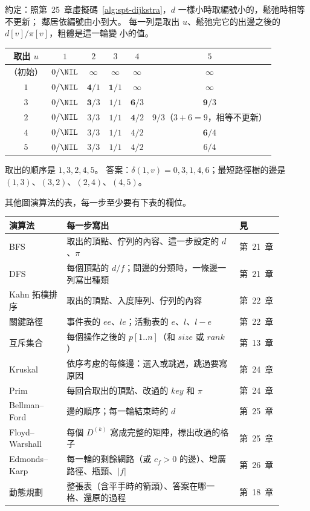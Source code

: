 \begin{exmgood}
約定：照第~25~章虛擬碼~\ref{alg:spt-dijkstra}，$d$ 一樣小時取編號小的，鬆弛時相等不更新；
鄰居依編號由小到大。 每一列是取出 $u$、鬆弛完它的出邊之後的 $d[v]/\pi[v]$，粗體是這一輪變
小的值。
\begin{center}
\small
\begin{tabular}{cccccc}
\toprule
取出 $u$ & $1$ & $2$ & $3$ & $4$ & $5$ \\
\midrule
（初始） & $0/\NIL$ & $\infty$ & $\infty$ & $\infty$ & $\infty$ \\
$1$ & $0/\NIL$ & $\mathbf{4}/1$ & $\mathbf{1}/1$ & $\infty$ & $\infty$ \\
$3$ & $0/\NIL$ & $\mathbf{3}/3$ & $1/1$ & $\mathbf{6}/3$ & $\mathbf{9}/3$ \\
$2$ & $0/\NIL$ & $3/3$ & $1/1$ & $\mathbf{4}/2$ & $9/3$（$3 + 6 = 9$，相等不更新） \\
$4$ & $0/\NIL$ & $3/3$ & $1/1$ & $4/2$ & $\mathbf{6}/4$ \\
$5$ & $0/\NIL$ & $3/3$ & $1/1$ & $4/2$ & $6/4$ \\
\bottomrule
\end{tabular}
\end{center}
取出的順序是 $1, 3, 2, 4, 5$。 答案：$\delta(1, v) = 0, 3, 1, 4, 6$；最短路徑樹的邊是
$(1, 3)$、$(3, 2)$、$(2, 4)$、$(4, 5)$。
\end{exmgood}

其他圖演算法的表，每一步至少要有下表的欄位。

\begin{center}
\small
\begin{tabular}{p{0.2\linewidth}p{0.6\linewidth}p{0.1\linewidth}}
\toprule
演算法 & 每一步寫出 & 見 \\
\midrule
BFS & 取出的頂點、佇列的內容、這一步設定的 $d$、$\pi$ & 第~21~章 \\
DFS & 每個頂點的 $d/f$；問邊的分類時，一條邊一列寫出種類 & 第~21~章 \\
Kahn 拓樸排序 & 取出的頂點、入度陣列、佇列的內容 & 第~22~章 \\
關鍵路徑 & 事件表的 $\mathit{ee}$、$\mathit{le}$；活動表的 $e$、$l$、$l - e$ & 第~22~章 \\
互斥集合 & 每個操作之後的 $p[1..n]$（和 $\mathit{size}$ 或 $\mathit{rank}$） & 第~13~章 \\
Kruskal & 依序考慮的每條邊：選入或跳過，跳過要寫原因 & 第~24~章 \\
Prim & 每回合取出的頂點、改過的 $\mathit{key}$ 和 $\pi$ & 第~24~章 \\
Bellman--Ford & 邊的順序；每一輪結束時的 $d$ & 第~25~章 \\
Floyd--Warshall & 每個 $D^{(k)}$ 寫成完整的矩陣，標出改過的格子 & 第~25~章 \\
Edmonds--Karp & 每一輪的剩餘網路（或 $c_f > 0$ 的邊）、增廣路徑、瓶頸、$|f|$ & 第~26~章 \\
動態規劃 & 整張表（含平手時的箭頭）、答案在哪一格、還原的過程 & 第~18~章 \\
\bottomrule
\end{tabular}
\end{center}

